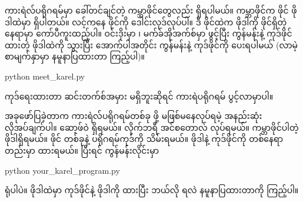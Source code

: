 ကားရဲလ်ပရိုဂရမ်မှာ ခေါ်တင်ချင်တဲ့ ကမ္ဘာဖိုင်တွေလည်း ရှိရပါမယ်။   ကမ္ဘာဖိုင်က  ဖိုင်  ဖိုဒါထဲမှာ ရှိပါတယ်။   လင့်ကနေ   ဖိုင်ကို ဒေါင်းလုဒ်လုပ်ပါ။ ဒီ  ဖိုင်ထဲက  ဖိုဒါကို  ဖိုင်ရှိတဲ့နေရာမှာ ကော်ပီကူးထည့်ပါ။ ဝင်းဒိုးမှာ  ၊ မက်ခ်အိုအက်စ်မှာ   ဖွင့်ပြီး  ကွန်မန်းနဲ့ ကုဒ်ဖိုင်ထားတဲ့ ဖိုဒါထဲကို သွားပြီး အောက်ပါအတိုင်း  ကွန်မန်းနဲ့ ကုဒ်ဖိုင်ကို  ပေးရပါမယ် (လာမဲ့စာမျက်နှာမှာ နမူနာပြထားတာ ကြည့်ပါ)။ 
%
\begin{codetxt}
python meet_karel.py
\end{codetxt}
ကုဒ်ရေးထားတာ ဆင်းတက်စ်အမှား မရှိဘူးဆိုရင် ကားရဲပရိုဂရမ် ပွင့်လာမှာပါ။

အခုဖော်ပြခဲ့တာက ကားရဲလ်ပရိုဂရမ်တစ်ခု  ဖို့ မဖြစ်မနေလုပ်ရမဲ့ အနည်းဆုံးလိုအပ်ချက်ပါ။  ဆော့ဖ်ဝဲ ရှိရမယ်။  လိုက်ဘရီ အင်စတောလ် လုပ်ရမယ်။ ကမ္ဘာဖိုင်ပါတဲ့  ဖိုဒါရှိရမယ်။  ဖိုင် တစ်ခုနဲ့ ပရိုဂရမ်ကုဒ်ကို သိမ်းရမယ်။  ဖိုဒါနဲ့ ကုဒ်ဖိုင်ကို တစ်နေရာတည်းမှာ ထားရမယ်။ ပြီးရင် ကွန်မန်းလိုင်းမှာ 
%
\begin{codetxt}
python your_karel_program.py
\end{codetxt}
 ရုံပါပဲ။
 ဖိုဒါထဲမှာ ကုဒ်ဖိုင်နဲ့  ဖိုဒါကို ထားပြီး ဘယ်လို  ရလဲ နမူနာပြထားတာကို ကြည့်ပါ။

\begin{figure}[tbh!]
\caption{} 
\label{fig:projstruct}
\end{figure}

